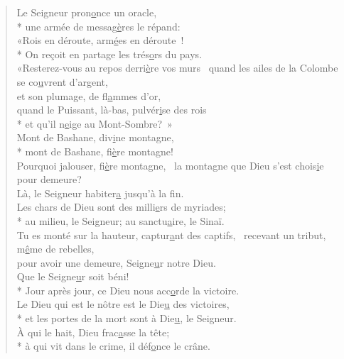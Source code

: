 \begin{verse}
Le Seigneur pron\underline{o}nce un oracle, \\*
une armée de messag\underline{è}res le répand: \\
«Rois en déroute, arm\underline{é}es en déroute ! \\*
On reçoit en partage les trés\underline{o}rs du pays. \\

«Resterez-vous au repos derri\underline{è}re vos murs \psalmdagger
quand les ailes de la Colombe se co\underline{u}vrent d’argent, \\
et son plumage, de fl\underline{a}mmes d’or, \\
quand le Puissant, là-bas, pulvér\underline{i}se des rois \\*
et qu’il n\underline{e}ige au Mont-Sombre? » \\

Mont de Bashane, div\underline{i}ne montagne, \\*
mont de Bashane, fi\underline{è}re montagne! \\
Pourquoi jalouser, fi\underline{è}re montagne,~\psalmdagger
la montagne que Dieu s’est chois\underline{i}e pour demeure? \\
Là, le Seigneur habiter\underline{a} jusqu’à la fin. \\

Les chars de Dieu sont des milli\underline{e}rs de myriades; \\*
au milieu, le Seigneur; au sanctu\underline{a}ire, le Sinaï. \\
Tu es monté sur la hauteur, captur\underline{a}nt des captifs,~\psalmdagger
recevant un tribut, m\underline{ê}me de rebelles, \\
pour avoir une demeure, Seigne\underline{u}r notre Dieu. \\

Que le Seigne\underline{u}r soit béni! \\*
Jour après jour, ce Dieu nous acc\underline{o}rde la victoire. \\

Le Dieu qui est le nôtre est le Die\underline{u} des victoires, \\*
et les portes de la mort sont à Die\underline{u}, le Seigneur. \\
À qui le hait, Dieu frac\underline{a}sse la tête; \\*
à qui vit dans le crime, il déf\underline{o}nce le crâne. \\


\end{verse}

